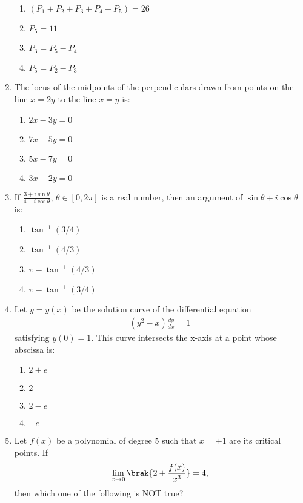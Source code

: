 \documentclass{article}
\begin{document}
\begin{enumerate}
\begin{enumerate}   
   \item $(P_1 + P_2 + P_3 + P_4 + P_5) = 26$
   \item $P_5 = 11$
   \item $P_3 = P_5 - P_4$
   \item $P_5 = P_2 - P_3$
\end{enumerate}

\item The locus of the midpoints of the perpendiculars drawn from points on the line $x = 2y$ to the line $x = y$ is:

\begin{enumerate}
   \item $2x - 3y = 0$
   \item $7x - 5y = 0$
   \item $5x - 7y = 0$
   \item $3x - 2y = 0$
\end{enumerate}

\item If $\frac{3 + i \sin \theta}{4 - i \cos \theta}$, $\theta \in [0, 2\pi]$ is a real number, then an argument of $\sin \theta + i \cos \theta$ is:

\begin{enumerate}
    \item $\tan^{-1}(3/4)$
    \item $\tan^{-1}(4/3)$
    \item $\pi - \tan^{-1}(4/3)$
    \item $\pi - \tan^{-1}(3/4)$
\end{enumerate}

\item Let $y = y(x)$ be the solution curve of the differential equation\begin{align*}(y^2 - x) \frac{dy}{dx} = 1\end{align*}satisfying $y(0) = 1$. This curve intersects the x-axis at a point whose abscissa is:

\begin{enumerate}
   \item $2+e$
   \item $2$
   \item $2 - e$
   \item $-e$
\end{enumerate}

\item  Let $f(x)$ be a polynomial of degree $5$ such that $x = \pm 1$ are its critical points. If \begin{align*}\lim_{x \to 0} \brak{ 2 + \frac{f(x)}{x^3}} = 4,\end{align*}then which one of the following is NOT true?


\end{enumerate}
\end{document}
